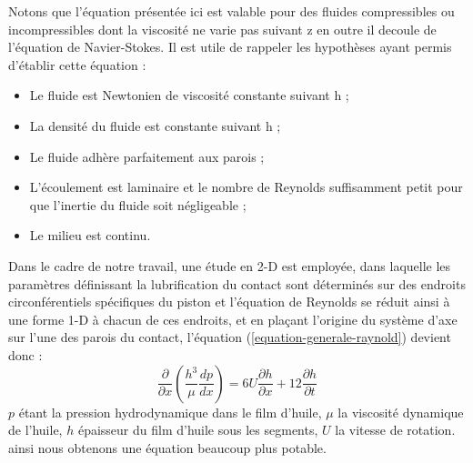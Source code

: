 Notons que l’équation présentée ici est valable pour des fluides compressibles ou incompressibles dont
la viscosité ne varie pas suivant z en outre il decoule de l'équation de Navier-Stokes. Il est utile de rappeler les hypothèses ayant permis d’établir cette équation :
\begin{itemize}
	\item Le fluide est Newtonien de viscosité constante suivant h ;
	\item La densité du fluide est constante suivant h ;
	\item Le fluide adhère parfaitement aux parois ;
	\item L’écoulement est laminaire et le nombre de Reynolds suffisamment petit pour que
	l’inertie du fluide soit négligeable ;
	\item Le milieu est continu.
\end{itemize}
Dans le cadre de notre travail, une étude en 2-D est employée, dans laquelle les paramètres définissant la lubrification du contact sont déterminés sur des endroits circonférentiels spécifiques du piston et l'équation de Reynolds se réduit ainsi à une forme 1-D à chacun de ces endroits, et en plaçant l'origine du système d'axe sur l'une des parois du contact, l'équation (\ref{equation-generale-raynold}) devient donc :
\begin{equation}
	\frac{\partial}{\partial x}{(\frac{h^3}{\mu}\frac{dp}{dx})}=6U\frac{\partial h}{\partial x}+12\frac{\partial h}{\partial t}
	\label{eq-reduite-raynold}
\end{equation}
$p$ étant la pression hydrodynamique dans le film d'huile, $\mu$ la viscosité dynamique de l'huile, $h$ épaisseur du film d'huile sous les segments, $U$ la vitesse de rotation. ainsi nous obtenons une équation beaucoup plus potable.

